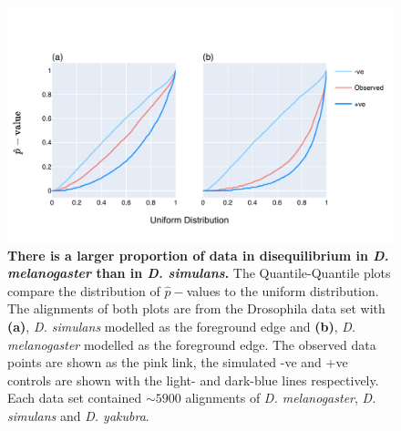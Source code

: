 \begin{figure}[htbp]
\centering
\includegraphics[width=	\textwidth]{figures/plots/drosophila/LRT-QQ.pdf}
\caption{\textbf{There is a larger proportion of data in disequilibrium in \textit{D. melanogaster} than in \textit{D. simulans}.} The Quantile-Quantile plots compare the distribution of $\hat p-$values to the uniform distribution. The alignments of both plots are from the Drosophila data set with \textbf{(a)}, \textit{D. simulans} modelled as the foreground edge and \textbf{(b)}, \textit{D. melanogaster} modelled as the foreground edge. The observed data points are shown as the pink link, the simulated -ve and +ve controls are shown with the light- and dark-blue lines respectively. Each data set contained $\sim 5900$ alignments of \textit{D. melanogaster}, \textit{D. simulans} and \textit{D. yakubra}. }
\label{fig:drosophila_lrt_qq}
\end{figure}
